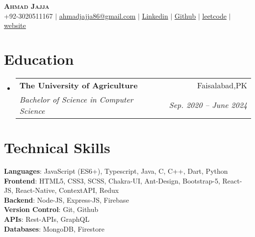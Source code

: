 \documentclass[letterpaper,11pt]{article}
\makeatletter
\newcommand{\resumeSubheading}[4]{
  \vspace{-2pt}\item
    \begin{tabular*}{0.97\textwidth}[t]{l@{\extracolsep{\fill}}r}
      \textbf{#1} & #2 \\
      \textit{\small#3} & \textit{\small #4} \\
    \end{tabular*}\vspace{-7pt}
}
\newcommand{\resumeSubHeadingListStart}{\begin{itemize}[leftmargin=0.15in, label={}]}
\newcommand{\resumeSubHeadingListEnd}{\end{itemize}}
\makeatother
\begin{document}

\begin{center}
    \textbf{\Huge \scshape Ahmad Jajja} \\ \vspace{1pt}
    \small +92-3020511167 $|$ 
    \href{mailto:ahmadjajja86@gmail.com}{\underline{ahmadjajja86@gmail.com}} $|$ 
    \href{https://www.linkedin.com/in/ahmad-jajja-ba8b34210/}{\underline{Linkedin}} $|$
    \href{https://github.com/Ahmadjajja}{\underline{Github}} $|$
    \href{https://leetcode.com/ahmadjajja86/}{\underline{leetcode}} $|$
    \href{https://ahmad-jajja.netlify.app/}{\underline{website}}
\end{center}

\section{Education}
  \resumeSubHeadingListStart
    \resumeSubheading
      {The University of Agriculture}{Faisalabad,PK}
      {Bachelor of Science in Computer Science}{Sep. 2020 -- June 2024}
  \resumeSubHeadingListEnd
%
\section{Technical Skills}
 \begin{itemize}[leftmargin=0.15in, label={}]
    \small{\item{
     \textbf{Languages}{: JavaScript (ES6+), Typescript, Java, C, C++, Dart, Python } \\
     \textbf{Frontend}{: HTML5, CSS3, SCSS, Chakra-UI, Ant-Design, Bootstrap-5, React-JS, React-Native, ContextAPI, Redux} \\
     \textbf{Backend}{: Node-JS, Express-JS, Firebase} \\
     \textbf{Version Control}{: Git, Github} \\
     \textbf{APIs}{: Rest-APIs, GraphQL} \\
     \textbf{Databases}{: MongoDB, Firestore}\\
    }}
 \end{itemize}
\end{document}
